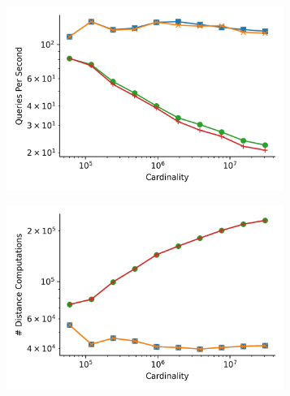\begin{figure}
\begin{subfigure}[b]{0.5\textwidth}
        \includegraphics[width=0.99\textwidth]{images/distance_counts/fashion-mnist_KnnBreadthFirst_10_throughput.png}
        \label{fig:results:sift-counts-throughput}
    \end{subfigure}%
    \begin{subfigure}[b]{0.5\textwidth}
        \includegraphics[width=0.99\textwidth]{images/distance_counts/fashion-mnist_KnnBreadthFirst_10_counts.png}
        \label{fig:results:random-counts-counts}
    \end{subfigure}%
    \\
    \begin{subfigure}[b]{0.5\textwidth}

\end{subfigure}
\end{figure}
